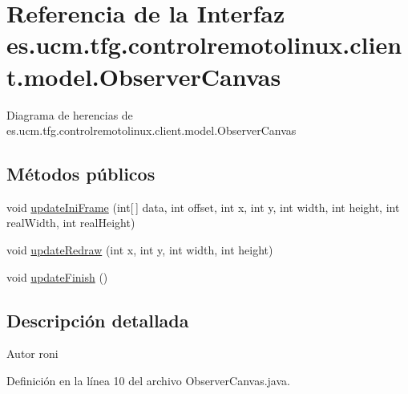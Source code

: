 \hypertarget{interfacees_1_1ucm_1_1tfg_1_1controlremotolinux_1_1client_1_1model_1_1ObserverCanvas}{\section{Referencia de la Interfaz es.\-ucm.\-tfg.\-controlremotolinux.\-client.\-model.\-Observer\-Canvas}
\label{interfacees_1_1ucm_1_1tfg_1_1controlremotolinux_1_1client_1_1model_1_1ObserverCanvas}
}


Diagrama de herencias de es.\-ucm.\-tfg.\-controlremotolinux.\-client.\-model.\-Observer\-Canvas
\subsection*{Métodos públicos}
\begin{DoxyCompactItemize}
\item 
void \hyperlink{interfacees_1_1ucm_1_1tfg_1_1controlremotolinux_1_1client_1_1model_1_1ObserverCanvas_a557e55b9a74bdf722c142df3c28abfdd}{update\-Ini\-Frame} (int\mbox{[}$\,$\mbox{]} data, int offset, int x, int y, int width, int height, int real\-Width, int real\-Height)
\item 
void \hyperlink{interfacees_1_1ucm_1_1tfg_1_1controlremotolinux_1_1client_1_1model_1_1ObserverCanvas_a2ca71b103185e2aa8ff4214439720cb4}{update\-Redraw} (int x, int y, int width, int height)
\item 
void \hyperlink{interfacees_1_1ucm_1_1tfg_1_1controlremotolinux_1_1client_1_1model_1_1ObserverCanvas_ad19c4f26f6a1133c3f5c24da1457c9da}{update\-Finish} ()
\end{DoxyCompactItemize}


\subsection{Descripción detallada}
\begin{DoxyAuthor}{Autor}
roni 
\end{DoxyAuthor}


Definición en la línea 10 del archivo Observer\-Canvas.\-java.



